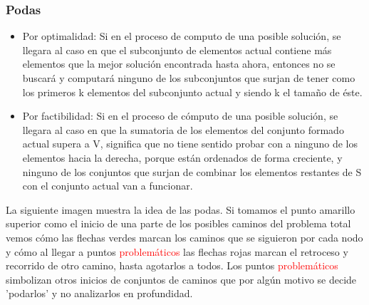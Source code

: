\documentclass[7pt,a4paper]{article}
\begin{document}
\subsubsection{Podas}
\begin{itemize}
	\item 
	Por optimalidad: Si en el proceso de computo de una posible solución, se llegara al caso en que el subconjunto de elementos actual contiene más elementos que la mejor solución encontrada hasta ahora, entonces no se buscará y computará ninguno de los subconjuntos que surjan de tener como los primeros k elementos del subconjunto actual y siendo k el tamaño de éste.
	\item 
	Por factibilidad: Si en el proceso de cómputo de una posible solución, se llegara al caso en que la sumatoria de los elementos del conjunto formado actual supera a V, significa que no tiene sentido probar con a ninguno de los elementos hacia la derecha, porque están ordenados de forma creciente, y ninguno de los conjuntos que surjan de combinar los elementos restantes de S con el conjunto actual van a funcionar.
\end{itemize}


La siguiente imagen muestra la idea de las podas. Si tomamos el punto amarillo superior como el inicio de una parte de los posibles caminos del problema total vemos cómo las flechas verdes marcan los caminos que se siguieron por cada nodo y cómo al llegar a puntos \textcolor{red}{problemáticos} las flechas rojas marcan el retroceso y recorrido de otro camino, hasta agotarlos a todos. Los puntos \textcolor{red}{problemáticos} simbolizan otros inicios de conjuntos de caminos que por algún motivo se decide 'podarlos' y no analizarlos en profundidad.
\end{document}
